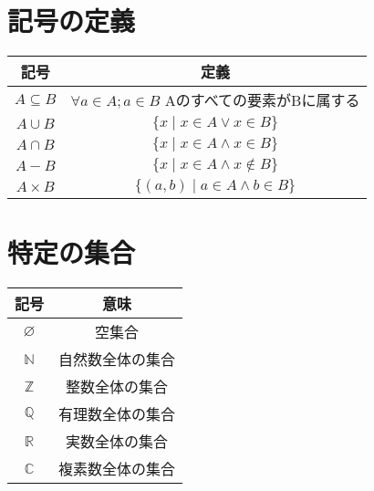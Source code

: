 \documentclass[a4paper,12pt]{ltjsarticle}
\begin{document}
\section{記号の定義}
\begin{table}[H]
    \centering
    \begin{tabular}{|c|c|}
        \hline
        記号 & 定義 \\
        \hline
        $A \subseteq B$ & $\forall a \in A ; a \in B$ \quad Aのすべての要素がBに属する \\
        \hline
        $A \cup B$ & $\{ x \mid x \in A \lor x \in B \}$ \\
        \hline
        $A \cap B$ & $\{ x \mid x \in A \land x \in B \}$ \\
        \hline
        $A - B$ & $\{ x \mid x \in A \land x \notin B \}$ \\
        \hline
        $A \times B$ & $\{ (a,b) \mid a \in A \land b \in B \}$ \\
        \hline
    \end{tabular}
\end{table}

\section{特定の集合}
\begin{table}[H]
    \centering
    \begin{tabular}{|c|c|}
        \hline
        記号 & 意味 \\
        \hline
        $\varnothing$ & 空集合 \\
        \hline
        $\mathbb{N}$ & 自然数全体の集合 \\
        \hline
        $\mathbb{Z}$ & 整数全体の集合 \\
        \hline
        $\mathbb{Q}$ & 有理数全体の集合 \\
        \hline
        $\mathbb{R}$ & 実数全体の集合 \\
        \hline
        $\mathbb{C}$ & 複素数全体の集合 \\
        \hline
    \end{tabular}
\end{table}
\end{document}
